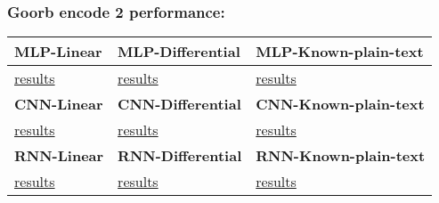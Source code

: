 \documentclass[oneside]{book}
\begin{document}
\subsubsection*{Goorb encode 2 performance:}

\begin{center}
\begin{tabular}{|>{\centering\arraybackslash}m{3cm}|>{\centering\arraybackslash}m{3cm}|>{\centering\arraybackslash}m{3cm}|} 
\hline
\rowcolor{cyan!20} \textbf{MLP-Linear} & \textbf{MLP-Differential} & \textbf{MLP-Known-plain-text} \\
\hline
\rowcolor{white} \href{https://github.com/bistoyek-official/Goorb-encode/tree/main/Goorb\%20Lab/Encryption/Performance/Goorb\%20encode\%202/MLP/Linear}{results} & \href{https://github.com/bistoyek-official/Goorb-encode/tree/main/Goorb\%20Lab/Encryption/Performance/Goorb\%20encode\%202/MLP/Differential}{results} & \href{https://github.com/bistoyek-official/Goorb-encode/tree/main/Goorb\%20Lab/Encryption/Performance/Goorb\%20encode\%202/MLP/Known-plain-text}{results} \\
\hline
\rowcolor{cyan!20} \textbf{CNN-Linear} & \textbf{CNN-Differential} & \textbf{CNN-Known-plain-text} \\
\hline
\rowcolor{white} \href{https://github.com/bistoyek-official/Goorb-encode/tree/main/Goorb\%20Lab/Encryption/Performance/Goorb\%20encode\%202/CNN/Linear}{results} & \href{https://github.com/bistoyek-official/Goorb-encode/tree/main/Goorb\%20Lab/Encryption/Performance/Goorb\%20encode\%202/CNN/Differential}{results} & \href{https://github.com/bistoyek-official/Goorb-encode/tree/main/Goorb\%20Lab/Encryption/Performance/Goorb\%20encode\%202/CNN/Known-plain-text}{results} \\
\hline
\rowcolor{cyan!20} \textbf{RNN-Linear} & \textbf{RNN-Differential} & \textbf{RNN-Known-plain-text} \\
\hline
\rowcolor{white} \href{https://github.com/bistoyek-official/Goorb-encode/tree/main/Goorb\%20Lab/Encryption/Performance/Goorb\%20encode\%202/RNN/Linear}{results} & \href{https://github.com/bistoyek-official/Goorb-encode/tree/main/Goorb\%20Lab/Encryption/Performance/Goorb\%20encode\%202/RNN/Differential}{results} & \href{https://github.com/bistoyek-official/Goorb-encode/tree/main/Goorb\%20Lab/Encryption/Performance/Goorb\%20encode\%202/RNN/Known-plain-text}{results} \\
\hline 
\end{tabular} 
\end{center}
\end{document}
